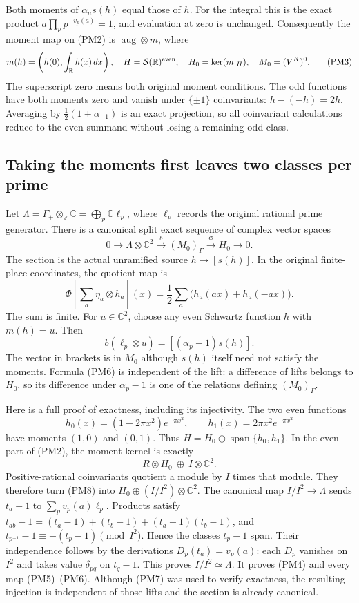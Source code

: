 Both moments of $\alpha_as(h)$ equal those of $h$. For the
integral this is the exact product $a\prod_p p^{-v_p(a)}=1$,
and evaluation at zero is unchanged. Consequently the moment
map on (PM2) is $\operatorname{aug}\otimes m$, where
\[
 m(h)=\left(h(0),\int_{\mathbb R}h(x)\,dx\right),\quad
 H=\mathcal S(\mathbb R)^{\rm even},\quad H_0=\ker(m|_H),
 \quad M_0=(V^K)^0.
 \tag{PM3}
\]
The superscript zero means both original moment conditions.
The odd functions have both moments zero and vanish under
$\{\pm1\}$ coinvariants: $h-(-h)=2h$. Averaging by
$\tfrac12(1+\alpha_{-1})$ is an exact projection, so all
coinvariant calculations reduce to the even summand without
losing a remaining odd class.

\subsection{Taking the moments first leaves two classes per prime}

Let $\Lambda=\Gamma_+\otimes_{\mathbb Z}\mathbb C
=\bigoplus_p\mathbb C\ell_p$, where $\ell_p$ records the
original rational prime generator. There is a canonical split
exact sequence of complex vector spaces
\[
 0\longrightarrow\Lambda\otimes\mathbb C^2
   \xrightarrow{\ b\ }(M_0)_\Gamma
   \xrightarrow{\ \Phi\ }H_0\longrightarrow0.
 \tag{PM4}
\]
The section is the actual unramified source $h\mapsto[s(h)]$.
In the original finite-place coordinates, the quotient map is
\[
 \Phi\left[\sum_a\eta_a\otimes h_a\right](x)
       =\frac12\sum_a\bigl(h_a(ax)+h_a(-ax)\bigr).
 \tag{PM5}
\]
The sum is finite. For $u\in\mathbb C^2$, choose any even
Schwartz function $h$ with $m(h)=u$. Then
\[
 b(\ell_p\otimes u)=[(\alpha_p-1)s(h)].
 \tag{PM6}
\]
The vector in brackets is in $M_0$ although $s(h)$ itself need
not satisfy the moments. Formula (PM6) is independent of the
lift: a difference of lifts belongs to $H_0$, so its difference
under $\alpha_p-1$ is one of the relations defining $(M_0)_\Gamma$.

Here is a full proof of exactness, including its injectivity.
The two even functions
\[
 h_0(x)=(1-2\pi x^2)e^{-\pi x^2},\qquad
 h_1(x)=2\pi x^2e^{-\pi x^2}
 \tag{PM7}
\]
have moments $(1,0)$ and $(0,1)$. Thus $H=H_0\oplus
\operatorname{span}\{h_0,h_1\}$. In the even part of (PM2),
the moment kernel is exactly
\[
 R\otimes H_0\ \oplus\ I\otimes\mathbb C^2.
 \tag{PM8}
\]
Positive-rational coinvariants quotient a module by $I$ times
that module. They therefore turn (PM8) into
$H_0\oplus(I/I^2)\otimes\mathbb C^2$.
The canonical map $I/I^2\to\Lambda$ sends $t_a-1$ to
$\sum_pv_p(a)\ell_p$. Products satisfy
$t_{ab}-1=(t_a-1)+(t_b-1)+(t_a-1)(t_b-1)$, and
$t_{p^{-1}}-1\equiv-(t_p-1)\pmod{I^2}$. Hence the classes
$t_p-1$ span. Their independence follows by the derivations
$D_p(t_a)=v_p(a)$: each $D_p$ vanishes on $I^2$ and takes
value $\delta_{pq}$ on $t_q-1$. This proves $I/I^2\simeq\Lambda$.
It proves (PM4) and every map (PM5)--(PM6). Although (PM7)
was used to verify exactness, the resulting injection is
independent of those lifts and the section is already canonical.

